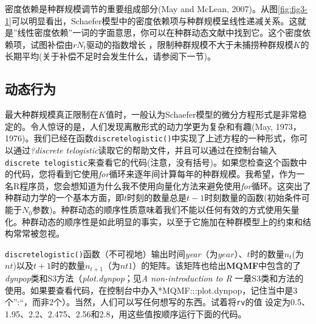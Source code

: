 \documentclass[
  lang=cn,
  11pt,
  scheme=chinese,
  chinesefont=nofont,
  citestyle=gb7714-2015,
  bibstyle=gb7714-2015]{elegantbook}
\begin{document}
密度依赖是种群规模调节的重要组成部分(May and McLean, 2007)。从图\ref{fig:fig3-1}可以明显看出，Schaefer模型中的密度依赖项与种群规模呈线性递减关系。这就是''线性密度依赖''一词的字面意思，你可以在种群动态文献中找到它。这个密度依赖项，试图补偿由\(rN_t\)驱动的指数增长 ，限制种群规模不大于未捕捞种群规模\(K\)的长期平均(关于补偿不足时会发生什么，请参阅下一节)。

\subsection{动态行为}\label{ux52a8ux6001ux884cux4e3a}

最大种群规模真正限制在\(K\)值时，一般认为Schaefer模型的微分方程形式是非常稳定的。令人惊讶的是，人们发现离散形式的动力学更为复杂和有趣(May, 1973，1976)。我们已经在函数\texttt{discretelogistic()}中实现了上述方程的一种形式，你可以通过\emph{?discrete telogistic}读取它的帮助文件，并且可以通过在控制台输入\texttt{discrete\ telogistic}来查看它的代码(注意，没有括号)。如果您检查这个函数中的代码，您将看到它使用\emph{for}循环来逐年间计算每年的种群规模。我希望，作为一名R程序员，您会想知道为什么我不使用向量化方法来避免使用\emph{for}循环。这突出了种群动力学的一个基本方面，即\(t\)时刻的数量总是\(t-1\)时刻数量的函数(初始条件可能于\(N_0\)参数)。种群动态的顺序性质意味着我们不能以任何有效的方式使用矢量化。种群动态的顺序性是如此明显的事实，以至于它施加在种群模型上的约束和结构常常被忽视。

\texttt{discretelogistic()}函数（不可视地）输出时间\emph{year}（为\(year\)）、\(t\)时的数量\(n_t\)(为\(nt\))以及\(t+1\)时的数量\(n_{t+1}\)（为\(nt1\)）的矩阵。该矩阵也给出\textbf{MQMF}中包含的了\emph{dynpop}类和S3方法（\emph{plot.dynpop}；见\emph{A non-introduction to R} 一章S3类和方法的使用。如果要查看代码，在控制台中办入*MQMF:::plot.dynpop，记住当中是3个'':``，而非2个）。当然，人们可以写任何想写的东西。试着将\texttt{rv}的值 设定为0.5、1.95、2.2、2.475、2.56和2.8，用这些值按顺序运行下面的代码。
\end{document}
